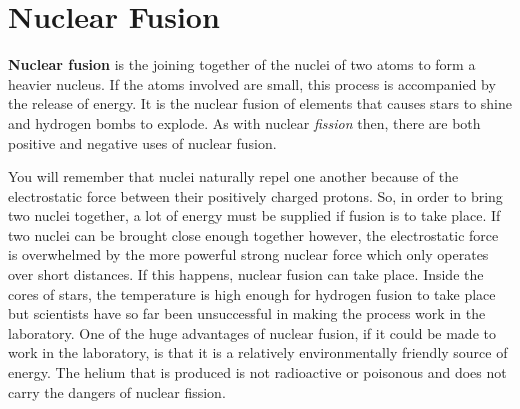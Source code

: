 






\section{Nuclear Fusion}
\label{sec:an:nfus}

\textbf{Nuclear fusion} is the joining together of the nuclei of two atoms to form a heavier nucleus. If the atoms involved are small, this process is accompanied by the release of energy. It is the nuclear fusion of elements that causes stars to shine and hydrogen bombs to explode. As with nuclear \textit{fission} then, there are both positive and negative uses of nuclear fusion.


You will remember that nuclei naturally repel one another because of the electrostatic force between their positively charged protons. So, in order to bring two nuclei together, a lot of energy must be supplied if fusion is to take place. If two nuclei can be brought close enough together however, the electrostatic force is overwhelmed by the more powerful strong nuclear force which only operates over short distances. If this happens, nuclear fusion can take place. Inside the cores of stars, the temperature is high enough for hydrogen fusion to take place but scientists have so far been unsuccessful in making the process work in the laboratory. One of the huge advantages of nuclear fusion, if it could be made to work in the laboratory, is that it is a relatively environmentally friendly source of energy. The helium that is produced is not radioactive or poisonous and does not carry the dangers of nuclear fission.\\



